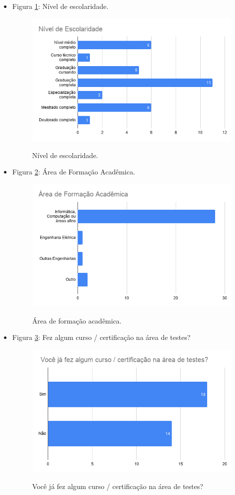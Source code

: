 \begin{itemize}
    
    \item Figura \ref{figure:s_escolaridade}: Nível de escolaridade.
    \begin{figure}[!htb]
    \centering
    \includegraphics[width=.80\textwidth]{images/s_escolaridade.png}
    \label{figure:s_escolaridade}
    \caption{Nível de escolaridade.}
    \end{figure}
    
    
    \item Figura \ref{figure:s_areaformacaoacademica}: Área de Formação Acadêmica.
    \begin{figure}[!htb]
    \centering
    \includegraphics[width=.80\textwidth]{images/s_areaformacaoacademica.png}
    \label{figure:s_areaformacaoacademica}
    \caption{Área de formação acadêmica.}
    \end{figure}
    
    
    \item Figura \ref{figure:s_certificacao}: Fez algum curso / certificação na área de testes?
    \begin{figure}[!htb]
    \centering
    \includegraphics[width=.70\textwidth]{images/s_certificacao.png}
    \label{figure:s_certificacao}
    \caption{Você já fez algum curso / certificação na área de testes?}
    \end{figure}
    

\end{itemize}
